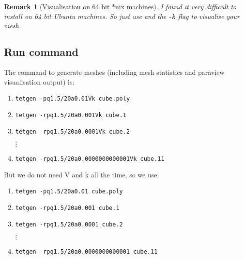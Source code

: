 \documentclass[12pt,twoside,a4paper]{article}
\numberwithin{equation}{section}
\newtheorem{remark}{Remark}[section]
\newcommand{\tetk}{\texttt{-k}}
\begin{document}
\begin{remark}[Visualisation on 64 bit *nix machines]
  I found it very difficult to install \tetview{} on 64 bit Ubuntu machines.
  So just use \paraview{} and the \tetk{} flag to visualise your mesh.
\end{remark}

\subsection{Run command}

\newcommand{\polyfile}{cube.poly}
\newcommand{\polyrfile}[1]{cube.#1}
\newcommand{\tetpparam}{p}
\newcommand{\tetqparam}{q1.5/20}
\newcommand{\tetaparam}[1]{a#1}
\newcommand{\tetVparam}{V}
\newcommand{\tetkparam}{k}
\newcommand{\tetrparam}{r}

\newcommand{\tetfull}{
  \texttt{tetgen 
  -\tetpparam\tetqparam\tetaparam{0.01}\tetVparam\tetkparam{} 
  \polyfile}}

\newcommand{\tetrfull}[2]{
  \texttt{tetgen 
  -\tetrparam\tetpparam\tetqparam\tetaparam{#1}\tetVparam\tetkparam{} 
  \polyrfile#2}}

The command to generate meshes (including mesh statistics and paraview
visualisation output) is:
\begin{enumerate}
\item  \tetfull{} 
\item  \tetrfull{0.001}{1} 
\item  \tetrfull{0.0001}{2}

  $\vdots$

  \setcounter{enumi}{11}
\item  \tetrfull{0.0000000000001}{11} 
\end{enumerate}
But we do not need \tetVparam{} and \tetkparam{} all the time, so we use:
\renewcommand{\tetfull}{
  \texttt{tetgen 
  -\tetpparam\tetqparam\tetaparam{0.01} 
  \polyfile}}

\renewcommand{\tetrfull}[2]{
  \texttt{tetgen 
  -\tetrparam\tetpparam\tetqparam\tetaparam{#1}
  \polyrfile#2}}
\begin{enumerate}
\item  \tetfull{} 
\item  \tetrfull{0.001}{1} 
\item  \tetrfull{0.0001}{2}

  $\vdots$

  \setcounter{enumi}{11}
\item  \tetrfull{0.0000000000001}{11} 
\end{enumerate}
\end{document}

